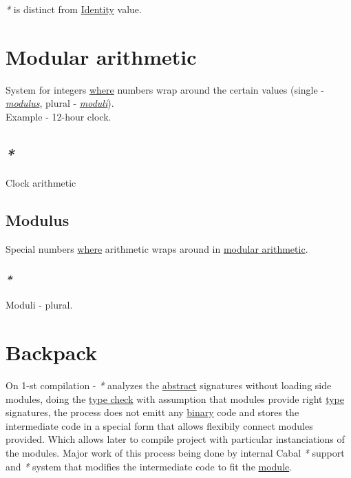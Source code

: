 \documentclass[a4paper,14pt,oneside]{book}
\begin{document}
\emph{*} is distinct from \hyperref[org5b82aa1]{Identity} value.\\

\chapter{\label{org7986b5c}Modular arithmetic}
\label{sec:orge271a8b}
System for integers \hyperref[org1a56575]{where} numbers wrap around the certain values (single - \emph{\hyperref[orgcba5cd5]{modulus}}, plural - \emph{\hyperref[org0832d1b]{moduli}}).\\

Example - 12-hour clock.\\

\section{\emph{*}}
\label{sec:org0abd086}

\label{org1d9e446}Clock arithmetic\\

\section{\label{orgcba5cd5}Modulus}
\label{sec:orgcb7c5b3}
Special numbers \hyperref[org1a56575]{where} arithmetic wraps around in \hyperref[org7986b5c]{modular arithmetic}.\\

\subsection{\emph{*}}
\label{sec:orgcbe896a}

\label{org0832d1b}Moduli - plural.\\

\chapter{\label{org2a35e33}Backpack}
\label{sec:orgc3f8a5b}
On 1-st compilation - \emph{*} analyzes the \hyperref[org9c8391a]{abstract} signatures without loading side modules, doing the \hyperref[orgeb7bd48]{type check} with assumption that modules provide right \hyperref[orgc4a7610]{type} signatures, the process does not emitt any \hyperref[org969957a]{binary} code and stores the intermediate code in a special form that allows flexibily connect modules provided. Which allows later to compile project with particular instanciations of the modules. Major work of this process being done by internal Cabal \emph{*} support and \emph{*} system that modifies the intermediate code to fit the \hyperref[org5a12534]{module}.\\
\end{document}
